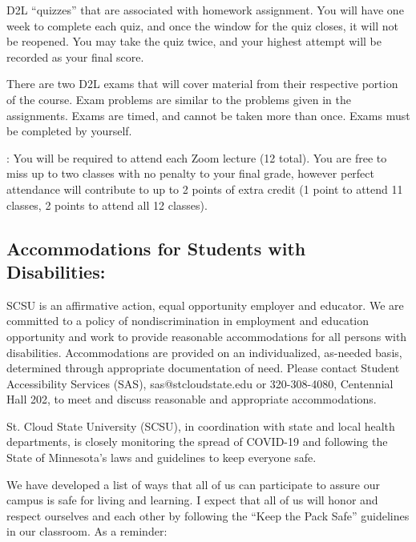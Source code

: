 \documentclass{tufte-handout}
\begin{document}
\begin{fullwidth}

  D2L ``quizzes'' that are associated with homework assignment. You will have one week to complete each quiz, and once the window for the quiz closes, it will not be reopened. You may take the quiz twice, and your highest attempt will be recorded as your final score.



 There are two D2L exams that will cover material from their respective portion of the course. Exam problems are similar to the problems given in the assignments. Exams are timed, and cannot be taken more than once. Exams must be completed by yourself.



: You will be required to attend each Zoom lecture (12 total). You are free to miss up to two classes with no penalty to your final grade, however perfect attendance will contribute to up to 2 points of extra credit (1 point to attend 11 classes, 2 points to attend all 12 classes).



\subsection{Accommodations for Students with Disabilities: } 

SCSU is an affirmative action, equal opportunity employer and educator. We are committed to a policy of nondiscrimination in employment and education opportunity and work to provide reasonable accommodations for all persons with disabilities. Accommodations are provided on an individualized, as-needed basis, determined through appropriate documentation of need. Please contact Student Accessibility Services (SAS), sas@stcloudstate.edu or 320-308-4080, Centennial Hall 202, to meet and discuss reasonable and appropriate accommodations. 



St. Cloud State University (SCSU), in coordination with state and local health departments, is closely monitoring the spread of COVID-19 and following the State of Minnesota’s laws and guidelines to keep everyone safe.

We have developed a list of ways that all of us can participate to assure our campus is safe for living and learning. I expect that all of us will honor and respect ourselves and each other by following the ``Keep the Pack Safe'' guidelines in our classroom. As a reminder:


\end{fullwidth}
\end{document}
